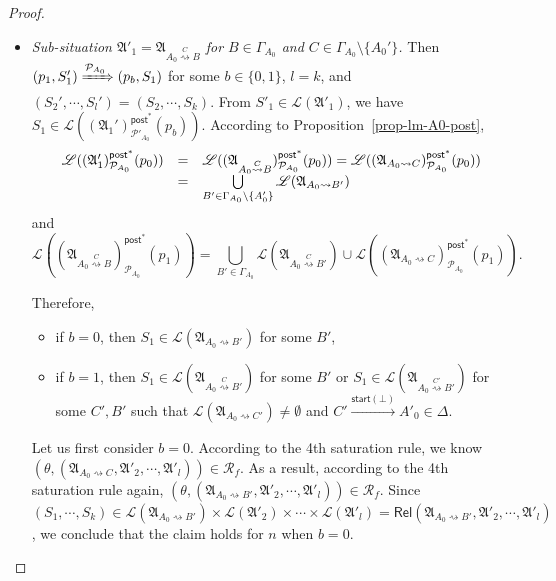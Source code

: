 \documentclass[preprint,12pt]{elsarticle}
\newcommand\Pp{{\mathcal{P} }}
\newcommand\act{{\sf Act}}
\newcommand\singletask{{\sf STK}}
\newcommand\singleinstance{{\sf SIT}}
\newcommand\startactivity{{\mathsf{start} }}
\newcommand\post{{\mathsf{post} }}
\newcommand\AutReach{\mathscr{R}}
\newcommand\Rel{\mathsf{Rel}}
\newcommand{\STK}{\mathsf{STK}}
\newcommand\Aut{{\mathfrak{A} }}
\newcommand\Lang{{\mathscr{L} }}
\newcommand{\NFA}{\textsf{NFA}}
\begin{document}
\begin{proof}
{\begin{itemize}
        \item \emph{Sub-situation $\Aut'_1 = \Aut_{A_0\stackrel{C}\rightsquigarrow B}$ for $B\in\Gamma_{A_0}$ and $C \in \Gamma_{A_0}\setminus\{A_0'\}$.}
    Then $(p_1,S_1') \xRightarrow{\Pp_{A_0}}(p_b, S_1)$ for some $b\in\{0,1\}$, $l=k$, and $(S_2',\cdots,S_l')=(S_2,\cdots,S_k)$. 
    From  $S'_1 \in \Lang(\Aut'_1)$, we have
    $S_1 \in \Lang((\Aut_1')^{\post^*}_{\Pp'_{A_0}}(p_b))$. 
    According to Proposition~\ref{prop-lm-A0-post},  
    $$
    \begin{array}{l c l}
    \Lang((\Aut_1')^{\post^*}_{\Pp_{A_0}}(p_0)) & = & \Lang((\Aut_{A_0\stackrel{C}\rightsquigarrow B})^{\post^*}_{\Pp_{A_0}}(p_0)) =\Lang((\Aut_{A_0 \rightsquigarrow C})^{\post^*}_{\Pp_{A_0}}(p_0)) \\
    & = & \bigcup\limits_{B' \in \Gamma_{A_0}\setminus\{A_0'\}} \Lang(\Aut_{A_0\rightsquigarrow B'})
    \end{array}
    $$ 
      and  
     $$\Lang((\Aut_{A_0\stackrel{C}\rightsquigarrow B})^{\post^*}_{\Pp_{A_0}}(p_1)) = 
    \bigcup\limits_{B'\in\Gamma_{A_0}} \Lang(\Aut_{A_0\stackrel{C}\rightsquigarrow B'}) \cup  \Lang((\Aut_{A_0 \rightsquigarrow C})^{\post^*}_{\Pp_{A_0}}(p_1)).$$
 
 Therefore, 
 \begin{itemize}
	\item if $b = 0$, then  $S_1 \in \Lang(\Aut_{A_0\rightsquigarrow B'})$ for some $B'$,
	\item if $b = 1$, then $S_1 \in \Lang(\Aut_{A_0\stackrel{C}{\rightsquigarrow} B'})$ for some $B'$ or $S_1 \in \Lang(\Aut_{A_0\stackrel{C'}{\rightsquigarrow} B'})$ for some $C', B'$ such that $\Lang(\Aut_{A_0\rightsquigarrow C'}) \neq \emptyset$ and $C' \xrightarrow[]{\startactivity(\bot)} A'_0 \in \Delta$.
\end{itemize} 
  
  Let us first consider $b =0$. According to the 4th saturation rule, we know $(\theta, (\Aut_{A_0\rightsquigarrow C}, \Aut'_2, \cdots, \Aut'_l)) \in \AutReach_f$. As a result, according to the 4th saturation rule again, $(\theta, (\Aut_{A_0\rightsquigarrow B'}, \Aut'_2, \cdots, \Aut'_l)) \in \AutReach_f$. Since $(S_1, \cdots, S_k) \in \Lang(\Aut_{A_0 \rightsquigarrow B'}) \times \Lang(\Aut'_2) \times \cdots \times \Lang(\Aut'_l) = \Rel(\Aut_{A_0 \rightsquigarrow B'}, \Aut'_2, \cdots, \Aut'_l)$, we conclude that the claim holds for $n$ when $b=0$. 
  

\end{itemize}}
\end{proof}
\end{document}
